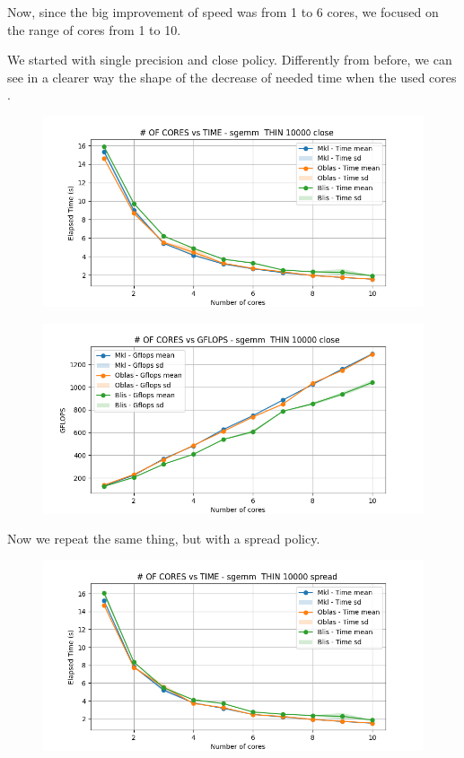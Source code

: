 \documentclass{article}
\begin{document}
Now, since the big improvement of speed was from 1 to 6 cores, we focused on the range of cores from 1 to 10.



We started with single precision and close policy. Differently from before, we can see in a clearer way the shape of the decrease of needed time when the used cores 
.   
\begin{figure}[H]
    \centering
    \includegraphics[width=\textwidth]{THIN scalability deep/sgemm__THIN_10000_close_time.png}
\end{figure}

\begin{figure}[H]
    \centering
    \includegraphics[width=\textwidth]{THIN scalability deep/sgemm__THIN_10000_close_gflops.png}
\end{figure}

Now we repeat the same thing, but with a spread policy.
\begin{figure}[H]
    \centering
    \includegraphics[width=\textwidth]{THIN scalability deep/sgemm__THIN_10000_spread_time.png}
\end{figure}
\end{document}
